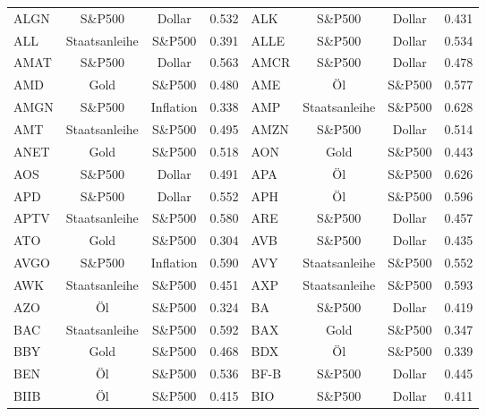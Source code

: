 \begin{longtable}{l c c c | l c c c}
    ALGN   & S\&P500       & Dollar    & 0.532         & ALK    & S\&P500       & Dollar    & 0.431         \\
    ALL    & Staatsanleihe & S\&P500   & 0.391         & ALLE   & S\&P500       & Dollar    & 0.534         \\
    AMAT   & S\&P500       & Dollar    & 0.563         & AMCR   & S\&P500       & Dollar    & 0.478         \\
    AMD    & Gold          & S\&P500   & 0.480         & AME    & Öl            & S\&P500   & 0.577         \\
    AMGN   & S\&P500       & Inflation & 0.338         & AMP    & Staatsanleihe & S\&P500   & 0.628         \\
    AMT    & Staatsanleihe & S\&P500   & 0.495         & AMZN   & S\&P500       & Dollar    & 0.514         \\
    ANET   & Gold          & S\&P500   & 0.518         & AON    & Gold          & S\&P500   & 0.443         \\
    AOS    & S\&P500       & Dollar    & 0.491         & APA    & Öl            & S\&P500   & 0.626         \\
    APD    & S\&P500       & Dollar    & 0.552         & APH    & Öl            & S\&P500   & 0.596         \\
    APTV   & Staatsanleihe & S\&P500   & 0.580         & ARE    & S\&P500       & Dollar    & 0.457         \\
    ATO    & Gold          & S\&P500   & 0.304         & AVB    & S\&P500       & Dollar    & 0.435         \\
    AVGO   & S\&P500       & Inflation & 0.590         & AVY    & Staatsanleihe & S\&P500   & 0.552         \\
    AWK    & Staatsanleihe & S\&P500   & 0.451         & AXP    & Staatsanleihe & S\&P500   & 0.593         \\
    AZO    & Öl            & S\&P500   & 0.324         & BA     & S\&P500       & Dollar    & 0.419         \\
    BAC    & Staatsanleihe & S\&P500   & 0.592         & BAX    & Gold          & S\&P500   & 0.347         \\
    BBY    & Gold          & S\&P500   & 0.468         & BDX    & Öl            & S\&P500   & 0.339         \\
    BEN    & Öl            & S\&P500   & 0.536         & BF-B   & S\&P500       & Dollar    & 0.445         \\
    BIIB   & Öl            & S\&P500   & 0.415         & BIO    & S\&P500       & Dollar    & 0.411         \\

\end{longtable}
